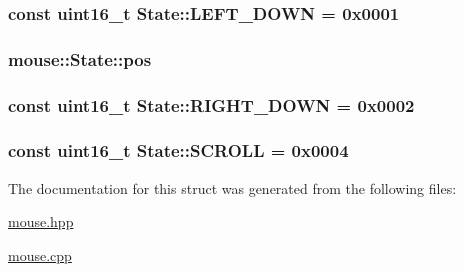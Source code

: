 \hypertarget{structmouse_1_1_state_a4f5eca97c989f6e8eceee194e2121fe8}{
\subsubsection[{L\-E\-F\-T\-\_\-\-D\-O\-W\-N}]{\setlength{\rightskip}{0pt plus 5cm}const uint16\-\_\-t {\bf State\-::\-L\-E\-F\-T\-\_\-\-D\-O\-W\-N} = 0x0001}}\label{structmouse_1_1_state_a4f5eca97c989f6e8eceee194e2121fe8}
\hypertarget{structmouse_1_1_state_ae4c6bba70a3c69992f7624bfc908b2c0}{
\subsubsection[{pos}]{ {\bf mouse\-::\-State\-::pos}}}\label{structmouse_1_1_state_ae4c6bba70a3c69992f7624bfc908b2c0}
\hypertarget{structmouse_1_1_state_ae07e315484a778beb62c47202be2808f}{
\subsubsection[{R\-I\-G\-H\-T\-\_\-\-D\-O\-W\-N}]{\setlength{\rightskip}{0pt plus 5cm}const uint16\-\_\-t {\bf State\-::\-R\-I\-G\-H\-T\-\_\-\-D\-O\-W\-N} = 0x0002}}\label{structmouse_1_1_state_ae07e315484a778beb62c47202be2808f}
\hypertarget{structmouse_1_1_state_a1b6e0054161b8a9dd801529566f34228}{
\subsubsection[{S\-C\-R\-O\-L\-L}]{\setlength{\rightskip}{0pt plus 5cm}const uint16\-\_\-t {\bf State\-::\-S\-C\-R\-O\-L\-L} = 0x0004}}\label{structmouse_1_1_state_a1b6e0054161b8a9dd801529566f34228}


The documentation for this struct was generated from the following files\-:\begin{DoxyCompactItemize}
\item 
\hyperlink{mouse_8hpp}{mouse.\-hpp}\item 
\hyperlink{mouse_8cpp}{mouse.\-cpp}\end{DoxyCompactItemize}
